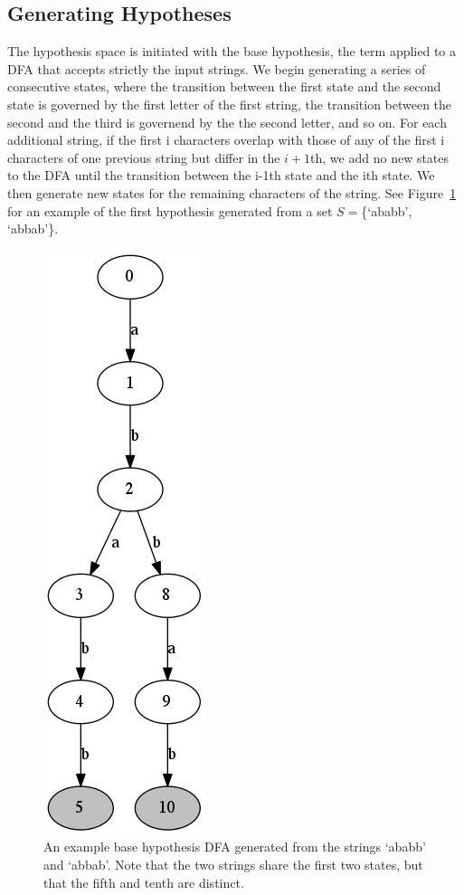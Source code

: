 \documentclass[10pt,letterpaper]{article}
\begin{document}
\subsection{Generating Hypotheses}
The hypothesis space is initiated with the base hypothesis, the term applied to a DFA that accepts strictly the input strings. We begin generating a series of consecutive states, where the transition between the first state and the second state is governed by the first letter of the first string, the transition between the second and the third is governend by the the second letter, and so on. For each additional string, if the first i characters overlap with those of any of the first i characters of one previous string but differ in the $i+1$th, we add no new states to the DFA until the transition between the i-1th state and the ith state. We then generate new states for the remaining characters of the string. See Figure~\ref{base_hypothesis} for an example of the first hypothesis generated from a set $S = $\{`ababb', `abbab'\}.
  \begin{figure}[ht]
\begin{center}
\includegraphics[scale=0.4]{base_hypothesis.png}
\end{center}
\caption{An example base hypothesis DFA generated from the strings `ababb' and `abbab'. Note that the two strings share the first two states, but that the fifth and tenth are distinct.} 
\label{base_hypothesis}
\end{figure}
\end{document}
